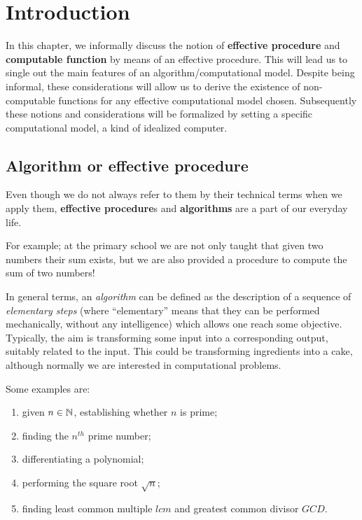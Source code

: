 \chapter{Introduction}\label{chap:intro}

In this chapter, we informally discuss the notion of \textbf{effective procedure} and \textbf{computable function} by means of an effective
procedure. This will lead us to single out the main features of an
algorithm/computational model.  Despite being informal, these
considerations will allow us to derive the existence of non-computable
functions for any effective computational model chosen.
%
Subsequently these notions and
considerations will be formalized by setting a specific computational model,
a kind of idealized computer.

\section{Algorithm or effective procedure}

Even though we do not always refer to them by their technical terms when we apply them, \textbf{effective procedure}s and \textbf{algorithms} are a part of our everyday life.

For example; at the primary school we are not only taught that given two numbers their sum exists, but we are also provided a procedure to compute the sum of two numbers!

In general terms, an \emph{algorithm} can be defined as the
description of a sequence of \emph{elementary steps} (where
``elementary'' means that they can be performed mechanically, without
any intelligence) which allows one reach some objective.  Typically,
the aim is transforming some input into a corresponding output,
suitably related to the input.
%
This could be transforming ingredients into a cake, although normally
we are interested in computational problems.

\begin{example}
  Some examples are:
  \begin{enumerate}

  \item given $n \in \mathbb{N}$, establishing whether $n$ is prime;
  \item finding the $n^{th}$ prime number;
  \item differentiating a polynomial;
  \item performing the square root $\sqrt{n}$;
  \item finding least common multiple $lcm$ and greatest common divisor $GCD$.
  \end{enumerate}
\end{example}

